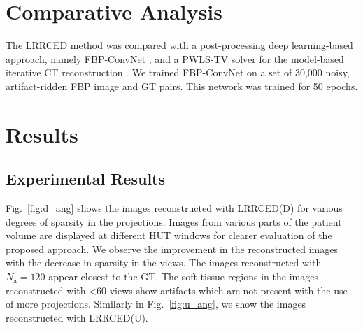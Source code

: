 \section{Comparative Analysis}

The  \ac{LRRCED} method was compared with a post-processing deep learning-based approach, namely FBP-ConvNet \cite{jin2017deep}, and a \ac{PWLS}-\ac{TV} solver for the model-based iterative \ac{CT} reconstruction \cite{tang2009performance}. We trained FBP-ConvNet on a set of 30,000 noisy, artifact-ridden \ac{FBP} image and \ac{GT} pairs. This network was trained for 50 epochs. 

\section{Results} \label{sec:results}

\subsection{Experimental Results}

Fig.~\ref{fig:d_ang} shows the images reconstructed with \ac{LRRCED}(D) for various degrees of sparsity in the projections. Images from various parts of the patient volume are displayed at different HUT windows for clearer evaluation of the proposed approach. We observe the improvement in the reconstructed images with the decrease in sparsity in the views. The images reconstructed with $N_\mathrm{a}=120$ appear closest to the \ac{GT}. The soft tissue regions in the images reconstructed with <60 views show artifacts which are not present with the use of more projections. Similarly in Fig.~\ref{fig:u_ang}, we show the images reconstructed with \ac{LRRCED}(U).  

